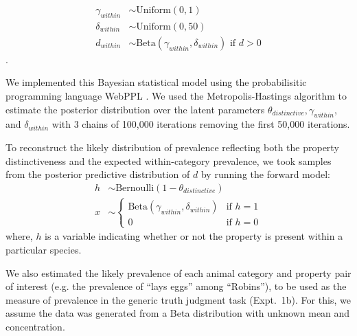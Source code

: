 \documentclass[10pt,letterpaper]{article}
\begin{document}
%
\begin{align*}
\gamma_{within} & \sim \text{Uniform}(0, 1) \\
\delta_{within} & \sim \text{Uniform}(0, 50) \\
d_{within} & \sim \text{Beta}(\gamma_{within}, \delta_{within})  \mbox{ if } d > 0
\end{align*}
%
%
. 
%

We implemented this Bayesian statistical model using the probabilisitic programming language WebPPL \cite{dippl}. 
We used the Metropolis-Hastings algorithm to estimate the posterior distribution over the latent parameters $\theta_{distinctive}, \gamma_{within}$, and $\delta_{within}$ with 3 chains of 100,000 iterations removing the first 50,000 iterations.

To reconstruct the likely distribution of  prevalence reflecting both the property distinctiveness and the expected within-category prevalence, we took samples from the posterior predictive distribution of $d$ by running the forward model: 
%
\begin{align*}
h & \sim \text{Bernoulli}(1 - \theta_{distinctive}) \\
x & \sim \begin{cases} 
		\text{Beta}(\gamma_{within}, \delta_{within}) &\mbox{if } h = 1 \\ 
				0 & \mbox{if } h=0
				\end{cases} 
\end{align*}
%
where, $h$ is a variable indicating whether or not the property is present within a particular species. 

We also estimated the likely prevalence of each animal category and property pair of interest (e.g. the prevalence of ``lays eggs'' among ``Robins''), to be used as the measure of prevalence in the generic truth judgment task (Expt.~1b). 
For this, we assume the data was generated from a Beta distribution with unknown mean and concentration. 
\end{document}
